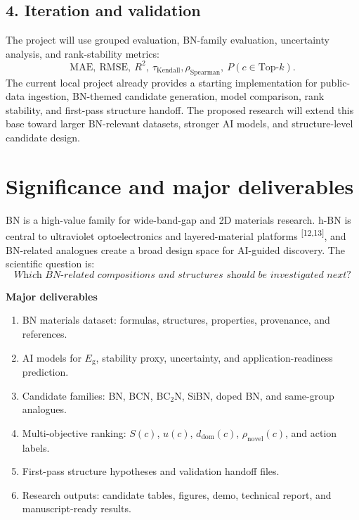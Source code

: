 \documentclass[10pt]{article}
\newcommand{\eg}{E_{\mathrm{g}}}
\newcommand{\unc}{u}
\newcommand{\domain}{d_{\mathrm{dom}}}
\begin{document}
\subsection*{4. Iteration and validation}
The project will use grouped evaluation, BN-family evaluation, uncertainty analysis, and rank-stability metrics:
\[
  \mathrm{MAE},\ \mathrm{RMSE},\ R^2,\ \tau_{\mathrm{Kendall}},
  \rho_{\mathrm{Spearman}},\ P(c\in\mathrm{Top}\text{-}k).
\]
The current local project already provides a starting implementation for public-data ingestion, BN-themed candidate generation, model comparison, rank stability, and first-pass structure handoff. The proposed research will extend this base toward larger BN-relevant datasets, stronger AI models, and structure-level candidate design.

\section*{Significance and major deliverables}
BN is a high-value family for wide-band-gap and 2D materials research. h-BN is central to ultraviolet optoelectronics and layered-material platforms \textsuperscript{[12,13]}, and BN-related analogues create a broad design space for AI-guided discovery. The scientific question is:
\[
  \textit{Which BN-related compositions and structures should be investigated next?}
\]

\textbf{Major deliverables}
\begin{enumerate}
  \item BN materials dataset: formulas, structures, properties, provenance, and references.
  \item AI models for $\eg$, stability proxy, uncertainty, and application-readiness prediction.
  \item Candidate families: BN, BCN, BC$_2$N, SiBN, doped BN, and same-group analogues.
  \item Multi-objective ranking: $S(c)$, $\unc(c)$, $\domain(c)$, $\rho_{\mathrm{novel}}(c)$, and action labels.
  \item First-pass structure hypotheses and validation handoff files.
  \item Research outputs: candidate tables, figures, demo, technical report, and manuscript-ready results.
\end{enumerate}
\end{document}
